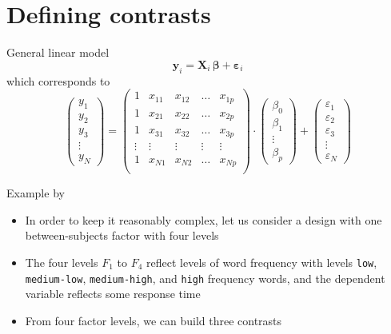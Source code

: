 \documentclass[aspectratio=169]{beamer}
\newcommand{\vect}[1]{\mathbf{#1}}
\newcommand{\mat}[1]{\mathbf{#1}}
\newcommand{\gvect}[1]{\boldsymbol{#1}}
\begin{document}
\section{Defining contrasts}

\begin{frame}{General linear model}
  \[
  \vect{y}_i = \mat{X}_i \, \gvect{\beta} + \gvect{\varepsilon}_i
\]
which corresponds to
\[
  \begin{pmatrix}
    y_1 \\
    y_2 \\
    y_3 \\
    \vdots \\
    y_N
  \end{pmatrix} = 
  \begin{pmatrix}
    1 & x_{11} & x_{12} & \dots & x_{1p} \\
    1 & x_{21} & x_{22} & \dots & x_{2p} \\
    1 & x_{31} & x_{32} & \dots & x_{3p} \\
    \vdots & \vdots & \vdots & \vdots & \vdots \\
    1 & x_{N1} & x_{N2} & \dots & x_{Np} \\
  \end{pmatrix} \cdot
  \begin{pmatrix}
    \beta_0 \\
    \beta_1 \\
    \vdots \\
    \beta_p
  \end{pmatrix} +
  \begin{pmatrix}
    \varepsilon_1 \\
    \varepsilon_2 \\
    \varepsilon_3 \\
    \vdots \\
    \varepsilon_N
  \end{pmatrix}
\]
\end{frame}

\begin{frame}[<+->]{Example by \citet{Schad2020}}
  \begin{itemize}
    \item In order to keep it reasonably complex, let us consider a design with
      one between-subjects factor with four levels
    \item The four levels $F_1$ to $F_4$ reflect levels of word frequency with
      levels \texttt{low}, \texttt{medium-low}, \texttt{medium-high}, and
      \texttt{high} frequency words, and the dependent variable reflects some
      response time
    \item From four factor levels, we can build three contrasts
  \end{itemize}
\end{frame}
\end{document}
